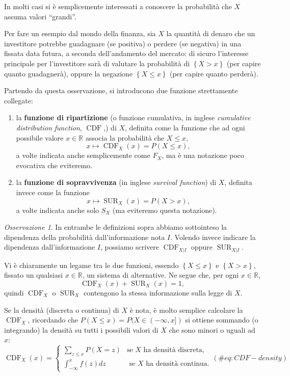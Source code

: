 \documentclass[
  italian,
  letterpaper,
]{book}
\newcommand{\cur}[1]{\left\{ #1 \right\}}
\newcommand{\R}{\mathbb{R}}
\newcommand{\SUR}{\operatorname{SUR}}
\newcommand{\CDF}{\operatorname{CDF}}
\theoremstyle{definition}
\theoremstyle{remark}
\newtheorem*{remark}{Osservazione}
\begin{document}
In molti casi si è semplicemente interessati a conoscere la probabilità
che \(X\) assuma valori ``grandi''.

Per fare un esempio dal mondo della finanza, sia \(X\) la quantità di
denaro che un investitore potrebbe guadagnare (se positiva) o perdere
(se negativa) in una fissata data futura, a seconda dell'andamento del
mercato: di sicuro l'interesse principale per l'investitore sarà di
valutare la probabilità di \(\cur{ X > x}\) (per capire quanto
guadagnerà), oppure la negazione \(\cur{X \le x}\) (per capire quanto
perderà).

Partendo da questa osservazione, si introducono due funzione
strettamente collegate:

\begin{enumerate}
\def\labelenumi{\arabic{enumi}.}
\item
  la \textbf{funzione di ripartizione} (o funzione cumulativa, in
  inglese \emph{cumulative distribution function}, \(\CDF\),) di \(X\),
  definita come la funzione che ad ogni possibile valore \(x \in \R\)
  associa la probabilità che \(X \le x\),
  \[ x \mapsto \CDF_X(x) = P(X \le x), \] a volte indicata anche
  semplicemente come \(F_X\), ma è una notazione poco evocativa che
  eviteremo.
\item
  la \textbf{funzione di sopravvivenza} (in inglese \emph{survival
  function}) di \(X\), definita invece come la funzione
  \[ x \mapsto \SUR_X(x) = P(X>x),\] a volte indicata anche solo \(S_X\)
  (ma eviteremo questa notazione).
\end{enumerate}

\begin{remark}
In entrambe le definizioni sopra abbiamo sottointeso la dipendenza della
probabilità dall'informazione nota \(I\). Volendo invece indicare la
dipendenza dall'informazione \(I\), possiamo scrivere \(\CDF_{X|I}\)
oppure \(\SUR_{X|I}\).
\end{remark}

Vi è chiaramente un legame tra le due funzioni, essendo
\(\cur{X \le x}\) e \(\cur{X>x}\), fissato un qualsiasi \(x \in \R\), un
sistema di alternative. Ne segue che, per ogni \(x \in \R\),
\[  \CDF_X(x) + \SUR_X(x) = 1,\] quindi \(\CDF_X\) o \(\SUR_X\)
contengono la stessa informazione sulla legge di \(X\).

Se la densità (discreta o continua) di \(X\) è nota, è molto semplice
calcolare la \(\CDF_X\), ricordando che
\(P(X \le x) = P(X \in (-\infty, x] )\) si ottiene sommando (o
integrando) la densità su tutti i possibili valori di \(X\) che sono
minori o uguali ad \(x\): \[ \CDF_X(x) = \begin{cases} 
\sum_{  z \le x} P(X = z ) & \text{se $X$ ha densità discreta,}\\
\int_{-\infty}^x f(z) d z & \text{ se $X$ ha densità continua.}\end{cases} (\#eq:CDF-density)\]
\end{document}
